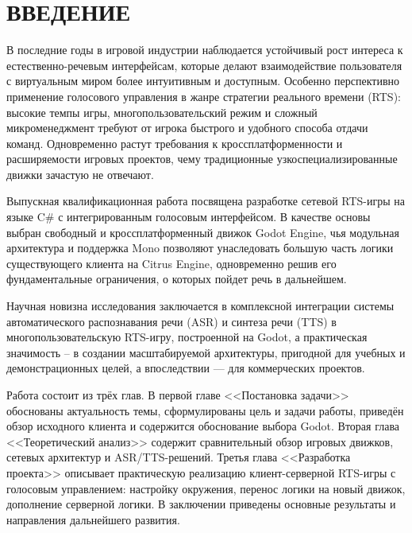 \section*{ВВЕДЕНИЕ}
    В последние годы в игровой индустрии наблюдается устойчивый рост интереса к естественно-речевым интерфейсам, которые делают взаимодействие 
    пользователя с виртуальным миром более интуитивным и доступным. Особенно перспективно применение голосового управления в жанре стратегии 
    реального времени (RTS): высокие темпы игры, многопользовательский режим и сложный микроменеджмент требуют от игрока быстрого и удобного 
    способа отдачи команд. Одновременно растут требования к кроссплатформенности и расширяемости игровых проектов, чему традиционные 
    узкоспециализированные движки зачастую не отвечают.

    Выпускная квалификационная работа посвящена разработке сетевой RTS-игры на языке C\# с интегрированным голосовым интерфейсом. В качестве основы 
    выбран свободный и кроссплатформенный движок Godot Engine, чья модульная архитектура и поддержка Mono позволяют унаследовать большую часть 
    логики существующего клиента на Citrus Engine, одновременно решив его фундаментальные ограничения, о которых пойдет речь в дальнейшем.

    Научная новизна исследования заключается в комплексной интеграции системы автоматического распознавания речи (ASR) и синтеза речи (TTS) в 
    многопользовательскую RTS-игру, построенной на Godot, а практическая значимость -- в создании масштабируемой архитектуры, пригодной для учебных и 
    демонстрационных целей, а впоследствии — для коммерческих проектов.

    Работа состоит из трёх глав. В первой главе <<Постановка задачи>> обоснованы актуальность темы, сформулированы цель и задачи 
    работы, приведён обзор исходного клиента и содержится обоснование выбора Godot. Вторая глава <<Теоретический анализ>> 
    содержит сравнительный обзор игровых движков, сетевых архитектур и ASR/TTS-решений. 
    Третья глава <<Разработка проекта>> описывает практическую реализацию клиент-серверной RTS-игры с голосовым управлением: 
    настройку окружения, перенос логики на новый движок, дополнение серверной логики. 
    В заключении приведены основные результаты и направления дальнейшего развития.